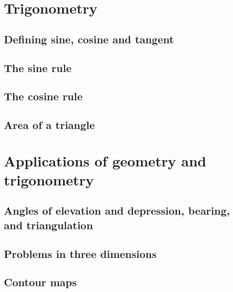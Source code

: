 \documentclass[a4paper,11pt]{article}
\begin{document}
\newpage

\section{Trigonometry}
\begin{outline}

\0
\subsection{Defining sine, cosine and tangent}

\0
\subsection{The sine rule}

\0
\subsection{The cosine rule}

\0
\subsection{Area of a triangle}

\end{outline}

\newpage

\section{Applications of geometry and trigonometry}
\begin{outline}

\0
\subsection{Angles of elevation and depression, bearing, and triangulation}

\0
\subsection{Problems in three dimensions}

\0
\subsection{Contour maps}

\end{outline}

\newpage
\end{document}
